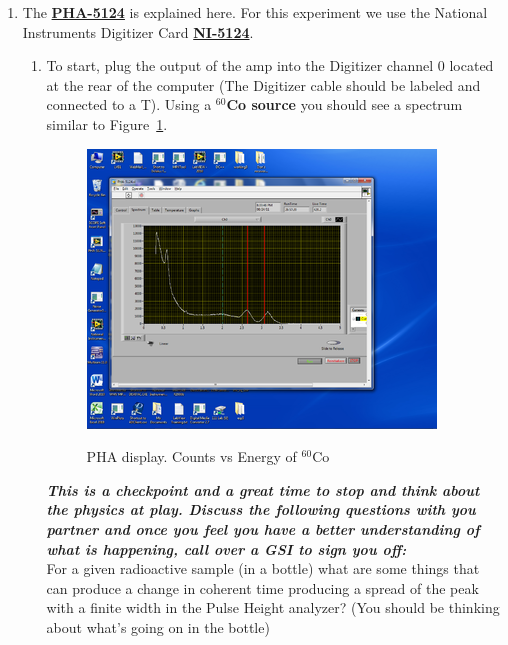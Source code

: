 \documentclass{../lab}
\begin{document}
\begin{enumerate}
    \item The \href{http://experimentationlab.berkeley.edu/PHA-5124Program}{\textbf{PHA-5124}} is explained here. For this experiment we use the National Instruments Digitizer Card \href{http://physics111.lib.berkeley.edu/Physics111/Reprints/GMA/NI_PCI-5124.pdf}{\textbf{NI-5124}}.
    \begin{enumerate}
        \item To start, plug the output of the amp into the Digitizer channel 0 located at the rear of the computer (The Digitizer cable should be labeled and connected to a T). Using a \textbf{$^{60}$Co source} you should see a spectrum similar to Figure~\ref{fig:350px-CO-60_Spectrum}.

        \begin{figure}[h]
            \centering
            \href{http://experimentationlab.berkeley.edu/sites/default/files/images/350px-CO-60_Spectrum.png}{\includegraphics[width=0.5\linewidth]{images/350px-CO-60_Spectrum.png}}
            \caption{PHA display. Counts vs Energy of $^{60}$Co}
            \label{fig:350px-CO-60_Spectrum}
        \end{figure}

    \emph{\textbf{This is a checkpoint and a great time to stop and think about the physics at play. Discuss the following questions with you partner and once you feel you have a better understanding of what is happening, call over a GSI to sign you off:}} \\
    For a given radioactive sample (in a bottle) what are  some things that can produce a change in coherent time producing a spread of the peak with a finite width in the Pulse Height analyzer? (You should be thinking about what's going on in the bottle)


\end{enumerate}
\end{enumerate}
\end{document}
